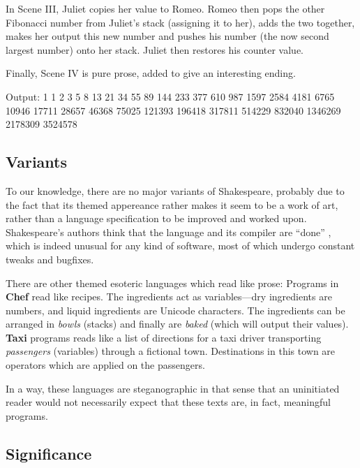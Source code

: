 

In Scene III, Juliet copies her value to Romeo. Romeo then pops the other Fibonacci number from Juliet's stack (assigning it to her), adds the two together, makes her output this new number and pushes his number (the now second largest number) onto her stack. Juliet then restores his counter value.



Finally, Scene IV is pure prose, added to give an interesting ending.



\begin{io}
Output:
1 1 2 3 5 8 13 21 34 55 89 144 233 377 610 987 1597 2584
4181 6765 10946 17711 28657 46368 75025 121393 196418
317811 514229 832040 1346269 2178309 3524578
\end{io}

\subsection{Variants}

To our knowledge, there are no major variants of Shakespeare, probably due to the fact that its themed appereance rather makes it seem to be a work of art, rather than a language specification to be improved and worked upon. Shakespeare's authors think that the language and its compiler are “done” \cite{herrick2011az}, which is indeed unusual for any kind of software, most of which undergo constant tweaks and bugfixes.

There are other themed esoteric languages which read like prose: Programs in \textbf{Chef} read like recipes. The ingredients act as variables---dry ingredients are numbers, and liquid ingredients are Unicode characters. The ingredients can be arranged in \emph{bowls} (stacks) and finally are \emph{baked} (which will output their values). \textbf{Taxi} programs reads like a list of directions for a taxi driver transporting \emph{passengers} (variables) through a fictional town. Destinations in this town are operators which are applied on the passengers.

In a way, these languages are steganographic in that sense that an uninitiated reader would not necessarily expect that these texts are, in fact, meaningful programs.

\subsection{Significance}

